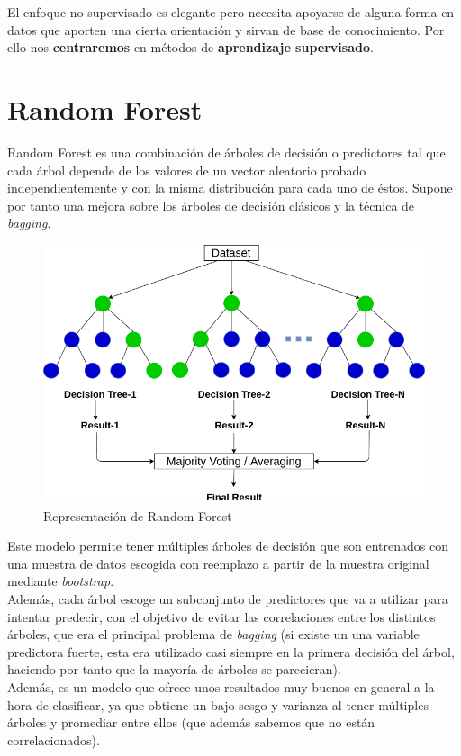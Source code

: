 \documentclass[a4paper,12pt]{report}
\begin{document}
{\setlength{\parindent}{0cm}
El enfoque no supervisado es elegante pero necesita apoyarse de alguna forma en datos que aporten una cierta orientación y sirvan de base de conocimiento. Por ello nos \textbf{centraremos} en métodos de \textbf{aprendizaje supervisado}.}


\vspace{6mm}
\section{Random Forest}

{\setlength{\parindent}{0cm}
Random Forest es una combinación de árboles de decisión o predictores
tal que cada árbol depende de los valores de un vector aleatorio probado independientemente y con la misma
distribución para cada uno de éstos. Supone por tanto una mejora sobre los árboles de decisión clásicos y la técnica de \textit{bagging}.}

\begin{figure}[htbp!]
\centering
\includegraphics[scale=0.4]{images/rf.png}
\caption{Representación de Random Forest}
\end{figure}

{\setlength{\parindent}{0cm}
Este modelo permite tener múltiples árboles de decisión que son entrenados con una muestra de datos escogida con reemplazo a partir de la muestra original mediante \textit{bootstrap}. }
\vspace{2mm}
\\Además, cada árbol escoge un subconjunto de predictores que va a utilizar para intentar predecir, con el objetivo de evitar las correlaciones entre los distintos árboles, que era el principal problema de \textit{bagging} (si existe un una variable predictora fuerte, esta era utilizado casi siempre en la primera decisión del árbol, haciendo por tanto que la mayoría de árboles se parecieran).
\vspace{2mm}
\\Además, es un modelo que ofrece unos resultados muy buenos en general a la hora de clasificar, ya que obtiene un bajo sesgo y varianza al tener múltiples árboles y promediar entre ellos (que además sabemos que no están correlacionados).
\end{document}

